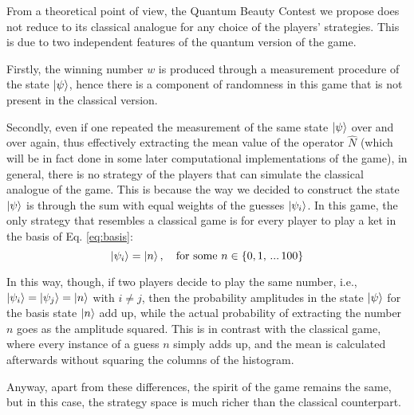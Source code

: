 From a theoretical point of view, the Quantum Beauty Contest we propose does not reduce to its classical analogue for any choice of the players' strategies. This is due to two independent features of the quantum version of the game.

Firstly, the winning number $w$ is produced through a measurement procedure of the state $\ket{\psi}$, hence there is a component of randomness in this game that is not present in the classical version.

Secondly, even if one repeated the measurement of the same state $\ket{\psi}$ over and over again, thus effectively extracting the mean value of the operator $\hat{N}$ (which will be in fact done in some later computational implementations of the game), in general, there is no strategy of the players that can simulate the classical analogue of the game. This is because the way we decided to construct the state $\ket{\psi}$ is through the sum with equal weights of the guesses $\ket{\psi_i}$. In this game, the only strategy that resembles a classical game is for every player to play a ket in the basis of Eq. \ref{eq:basis}:
\begin{equation}
  \ket{\psi_i}=\ket{n},\quad \text{for some }n\in\{0,1,\,...\,100\}
\end{equation}

In this way, though, if two players decide to play the same number, i.e., $\ket{\psi_i}=\ket{\psi_j}=\ket{n}$ with $i\neq j$, then the probability amplitudes in the state $\ket{\psi}$ for the basis state $\ket{n}$ add up, while the actual probability of extracting the number $n$ goes as the amplitude squared. This is in contrast with the classical game, where every instance of a guess $n$ simply adds up, and the mean is calculated afterwards without squaring the columns of the histogram.

Anyway, apart from these differences, the spirit of the game remains the same, but in this case, the strategy space is much richer than the classical counterpart.
